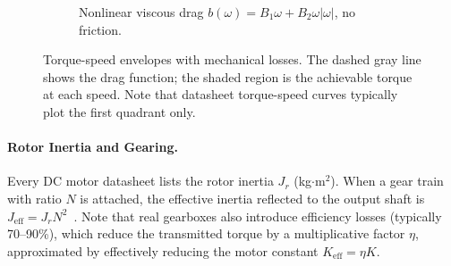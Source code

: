 \documentclass[10pt, a4paper, twocolumn]{article}
\begin{document}
\begin{figure}[H]
\begin{subfigure}[t]{\columnwidth}
\centering
{}
\caption{Nonlinear viscous drag $b(\omega) = B_1\omega + B_2\omega|\omega|$, no friction.}
\label{fig:drag_nonlinear}
\end{subfigure}

\caption{Torque-speed envelopes with mechanical losses. The dashed gray line shows the drag function; the shaded region is the achievable torque at each speed. Note that datasheet torque-speed curves typically plot the first quadrant only.}
\label{fig:drag}
\end{figure}

\paragraph{Rotor Inertia and Gearing.}
Every DC motor datasheet lists the rotor inertia $J_r$ (kg$\cdot$m$^2$). When a gear train with ratio $N$ is attached, the effective inertia reflected to the output shaft is $J_{\text{eff}} = J_r N^2$~\cite{tedrake2024}. Note that real gearboxes also introduce efficiency losses (typically 70--90\%), which reduce the transmitted torque by a multiplicative factor $\eta$, approximated by effectively reducing the motor constant $K_{\text{eff}} = \eta K$.
\end{document}
